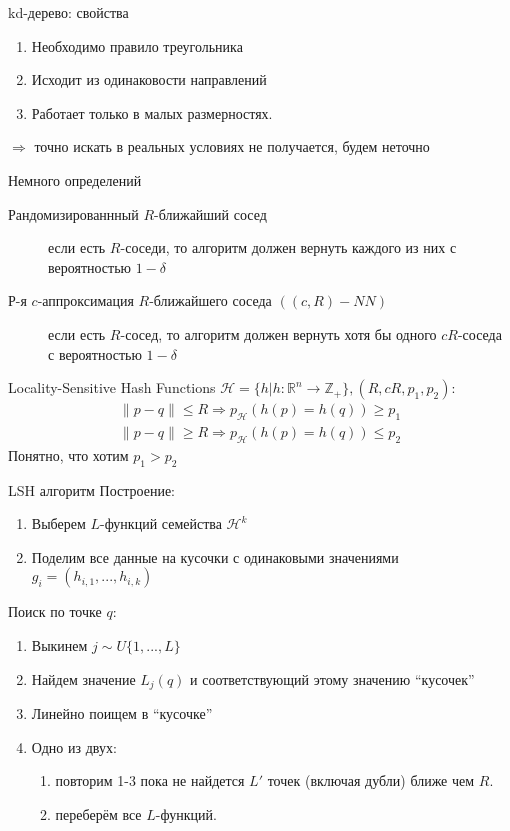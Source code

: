 \documentclass[14pt, fleqn, xcolor={dvipsnames, table}]{beamer}
\begin{document}
\begin{frame}{kd-дерево: свойства}
\begin{enumerate}
  \item Необходимо правило треугольника
  \item Исходит из одинаковости направлений
  \item Работает только в малых размерностях.
\end{enumerate}
$\Rightarrow$ точно искать в реальных условиях не получается, будем неточно
\end{frame}

\begin{frame}{Немного определений}
\small
\begin{description}
  \item [\color{blue}Рандомизированнный $R$-ближайший сосед] если есть $R$-соседи, то алгоритм должен вернуть каждого из них с вероятностью $1 - \delta$
  \item [\color{blue}Р-я $c$-аппроксимация $R$-ближайшего соседа $((c , R ) - NN )$] если есть $R$-сосед, то алгоритм должен вернуть хотя бы одного $cR$-соседа с вероятностью $1 - \delta$
\end{description}
\end{frame}

\begin{frame}{Locality-Sensitive Hash Functions}
$\mathcal{H} = \{h|h: \mathbb{R}^n \to \mathbb{Z}_+\}, (R,cR,p_1,p_2):$
$$\begin{array}{l}
  \|p-q\| \le R \Rightarrow p_{\mathcal{H}}(h(p)=h(q)) \ge p_1 \\
  \|p-q\| \ge R \Rightarrow p_{\mathcal{H}}(h(p)=h(q)) \le p_2
\end{array}$$
Понятно, что хотим $p_1 > p_2$
\end{frame}


\begin{frame}{LSH алгоритм}
\small
Построение:
\begin{enumerate}
  \item Выберем $L$-функций семейства $\mathcal{H}^k$
  \item Поделим все данные на кусочки с одинаковыми значениями $g_i = (h_{i,1},...,h_{i,k})$
\end{enumerate}
Поиск по точке $q$:
\begin{enumerate}
  \item Выкинем $j \sim U\{1,...,L\}$
  \item Найдем значение $L_j(q)$ и соответствующий этому значению “кусочек”
  \item Линейно поищем в “кусочке”
  \item Одно из двух:
  \begin{enumerate}
    \item повторим 1-3 пока не найдется $L'$ точек (включая дубли) ближе чем $R$.
    \item переберём все $L$-функций.
  \end{enumerate}
\end{enumerate}
\end{frame}
\end{document}
